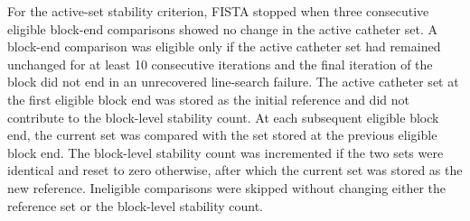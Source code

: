 \documentclass[12pt,twoside,letterpaper]{article}
\begin{document}
For the active-set stability criterion, FISTA stopped when three consecutive eligible block-end comparisons showed no change in the active catheter set. A block-end comparison was eligible only if the active catheter set had remained unchanged for at least 10 consecutive iterations and the final iteration of the block did not end in an unrecovered line-search failure. The active catheter set at the first eligible block end was stored as the initial reference and did not contribute to the block-level stability count. At each subsequent eligible block end, the current set was compared with the set stored at the previous eligible block end. The block-level stability count was incremented if the two sets were identical and reset to zero otherwise, after which the current set was stored as the new reference. Ineligible comparisons were skipped without changing either the reference set or the block-level stability count.
\end{document}
